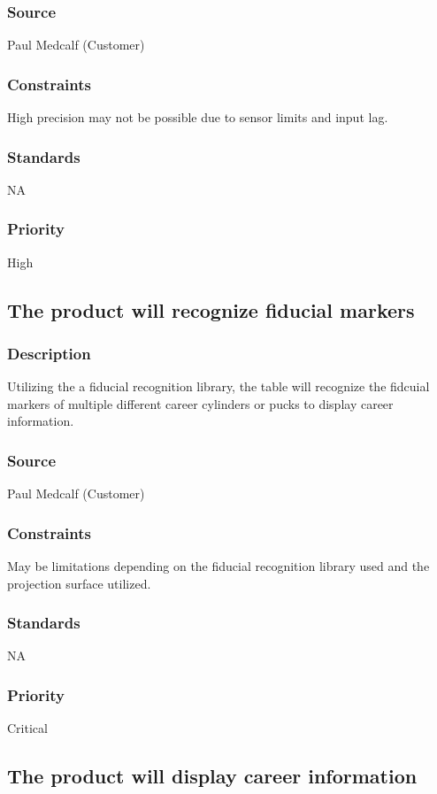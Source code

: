 \subsubsection{Source}
Paul Medcalf (Customer)
\subsubsection{Constraints}
High precision may not be possible due to sensor limits and input lag.
\subsubsection{Standards}
NA
\subsubsection{Priority}
High

\subsection{The product will recognize fiducial markers}
\subsubsection{Description}
Utilizing the a fiducial recognition library, the table will recognize the fidcuial markers of multiple different career cylinders or pucks to display career information.
\subsubsection{Source}
Paul Medcalf (Customer)
\subsubsection{Constraints}
May be limitations depending on the fiducial recognition library used and the projection surface utilized.
\subsubsection{Standards}
NA
\subsubsection{Priority}
Critical

\subsection{The product will display career information}
